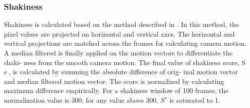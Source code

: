 \documentclass{sig-alternate}
\begin{document}
\subsubsection{Shakiness}
Shakiness is calculated based on the method described in \cite{salas:four}.
In this method, the pixel values are projected on horizontal and
vertical axes. The horizontal and vertical projections are matched
across the frames for calculating camera motion. A median filtered
is finally applied on the motion vectors to differentiate the shaki-
ness from the smooth camera motion. The final value of shakiness
score, S s , is calculated by summing the absolute difference of orig-
inal motion vector and median filtered motion vector. The score is
normalized by calculating maximum difference empirically. For a
shakiness window of 100 frames, the normalization value is 300;
for any value above 300, $S^s$ is saturated to 1.
\end{document}
